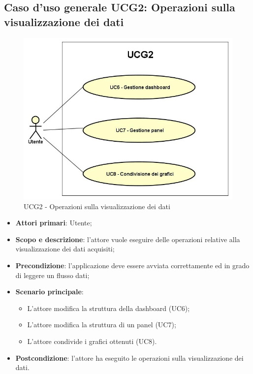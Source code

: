 \subsection{Caso d'uso generale UCG2: Operazioni sulla visualizzazione dei dati}
\begin{figure} [H]
	\centering
	\includegraphics[scale=0.5]{Img/UCG2}
	\caption{UCG2 - Operazioni sulla visualizzazione dei dati}
\end{figure}
\begin{itemize}
	\item{\textbf{Attori primari}: Utente;}
	\item{\textbf{Scopo e descrizione}: l'attore vuole eseguire delle operazioni relative alla visualizzazione dei dati acquisiti;}
	\item{\textbf{Precondizione}: l'applicazione deve essere avviata correttamente ed in grado di leggere un flusso dati;}
	\item{\textbf{Scenario principale}:
		\begin{itemize}
			\item{L'attore modifica la struttura della dashboard (UC6);}
			\item{L'attore modifica la struttura di un panel (UC7);}
			\item{L'attore condivide i grafici ottenuti (UC8)}.
		\end{itemize}
	}
	\item{\textbf{Postcondizione}: l'attore ha eseguito le operazioni sulla visualizzazione dei dati.}
\end{itemize}
\newpage
